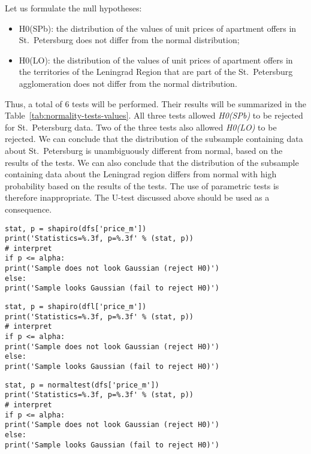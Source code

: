 \documentclass[]{scrreprt}
\begin{document}
Let us formulate the null hypotheses:
\begin{itemize}
	\item H0(SPb): the distribution of the values of unit prices of apartment offers in St.~Petersburg does not differ from the normal distribution;
	\item H0(LO): the distribution of the values of unit prices of apartment offers in the territories of the Leningrad Region that are part of the St.~Petersburg agglomeration does not differ from the normal distribution.
\end{itemize} 
Thus, a total of 6 tests will be performed. Their results will be summarized in the Table~\ref{tab:normality-tests-values}. All three tests allowed \emph{H0(SPb)} to be rejected for St.~Petersburg data. Two of the three tests also allowed \emph{H0(LO)} to be rejected. We can conclude that the distribution of the subsample containing data about St.~Petersburg is unambiguously different from normal, based on the results of the tests. We can also conclude that the distribution of the subsample containing data about the Leningrad region differs from normal with high probability based on the results of the tests. The use of parametric tests is therefore inappropriate. The U-test discussed above should be used as a consequence.
%
\begin{lstlisting}[float=htp, caption = Performing the Shapiro-Wilk test for St.~Petersburg data, firstnumber=1, label= lst:shapiro-wilk-test-spb]
stat, p = shapiro(dfs['price_m'])
print('Statistics=%.3f, p=%.3f' % (stat, p))
# interpret
if p <= alpha:
print('Sample does not look Gaussian (reject H0)')
else:
print('Sample looks Gaussian (fail to reject H0)')
\end{lstlisting}
%
\begin{lstlisting}[float=htp, caption = Performing the Shapiro-Wilk test for Leningrad Region data, firstnumber=1, label= lst:shapiro-wilk-test-lo]
stat, p = shapiro(dfl['price_m'])
print('Statistics=%.3f, p=%.3f' % (stat, p))
# interpret
if p <= alpha:
print('Sample does not look Gaussian (reject H0)')
else:
print('Sample looks Gaussian (fail to reject H0)')
\end{lstlisting}  
%
\begin{lstlisting}[float=htp, caption = Performing the D'Agostino's K-squared test for St.~Petersburg data, firstnumber=1, label= lst:K^2-D'Agostino-test-spb]
stat, p = normaltest(dfs['price_m'])
print('Statistics=%.3f, p=%.3f' % (stat, p))
# interpret
if p <= alpha:
print('Sample does not look Gaussian (reject H0)')
else:
print('Sample looks Gaussian (fail to reject H0)')
\end{lstlisting}
\end{document}
